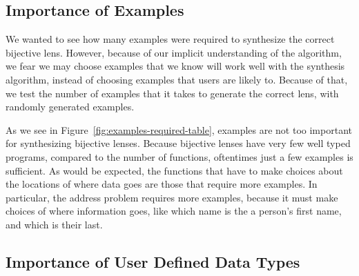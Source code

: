 \subsection{Importance of Examples}
We wanted to see how many examples were required to synthesize the correct
bijective lens.
However, because of our implicit understanding of the algorithm, we fear we may
choose examples that we know will work well with the synthesis algorithm,
instead of choosing examples that users are likely to.
Because of that, we test the number of examples that it takes to generate the
correct lens, with randomly generated examples.


As we see in Figure~\ref{fig:examples-required-table}, examples are not too
important for synthesizing bijective lenses.
Because bijective lenses have very few well typed programs, compared to the
number of functions, oftentimes just a few examples is sufficient.
As would be expected, the functions that have to make choices about the
locations of where data goes are those that require more examples.
In particular, the address problem requires more examples, because it must make
choices of where information goes, like which name is the a person's first name,
and which is their last.


\subsection{Importance of User Defined Data Types}

